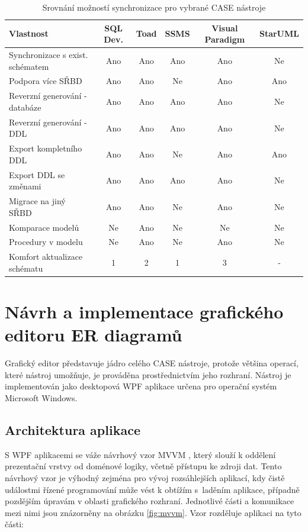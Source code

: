 \documentclass[czech,bachelor,public,dept460,male,oneside]{diploma}
\begin{document}
	\begin{table}[!h]
		\centering
		\caption{Srovnání možností synchronizace pro vybrané CASE nástroje}
		\label{tab:ddlCreateCmp}
		\begin{tabular}{l c c c c c}
			\toprule
			Vlastnost & SQL Dev. & Toad & SSMS & Visual Paradigm & StarUML \\
			\midrule
			Synchronizace s exist. schématem & Ano & Ano & Ano & Ano & Ne \\
			Podpora více SŘBD & Ano & Ano & Ne & Ano & Ano \\
			Reverzní generování - databáze & Ano & Ano & Ano & Ano & Ne \\
			Reverzní generování - DDL & Ano & Ano & Ano & Ano & Ne  \\
			Export kompletního DDL & Ano & Ano & Ne & Ano & Ano \\
			Export DDL se změnami & Ano & Ano & Ano & Ano & Ne \\
			Migrace na jiný SŘBD & Ano & Ano & Ne & Ano & Ne \\
			Komparace modelů & Ne & Ano & Ne & Ne & Ne \\
			Procedury v modelu & Ne & Ano & Ne & Ano & Ne \\
			Komfort aktualizace schématu & 1 & 2 & 1 & 3 & - \\
			\midrule
		\end{tabular}
	\end{table}
	
\newpage
\section{Návrh a implementace grafického editoru ER diagramů}
Grafický editor představuje jádro celého CASE nástroje, protože většina operací, které nástroj umožňuje, je prováděna prostřednictvím jeho rozhraní. Nástroj je implementován jako desktopová WPF aplikace \cite{wpf} určena pro operační systém Microsoft Windows. 
	
	\subsection{Architektura aplikace}
	S WPF aplikacemi se váže návrhový vzor MVVM \cite{mvvm}, který slouží k oddělení prezentační vrstvy od doménové logiky, včetně přístupu ke zdroji dat. Tento návrhový vzor je výhodný zejména pro vývoj rozsáhlejších aplikací, kdy čistě událostmi řízené programování může vést k obtížím s~laděním aplikace, případně pozdějším úpravám v oblasti grafického rozhraní. Jednotlivé části a komunikace mezi nimi jsou znázorněny na obrázku \ref{fig:mvvm}. Vzor rozděluje aplikaci na tyto části: 
	
\end{document}
